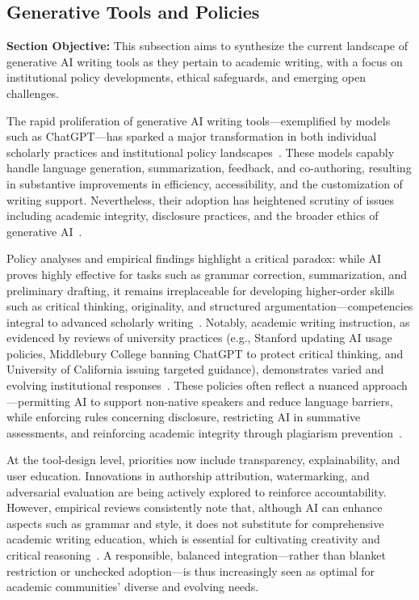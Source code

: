\documentclass[sigconf]{acmart}
\begin{document}
\subsection{Generative Tools and Policies}

\textbf{Section Objective:} This subsection aims to synthesize the current landscape of generative AI writing tools as they pertain to academic writing, with a focus on institutional policy developments, ethical safeguards, and emerging open challenges.

The rapid proliferation of generative AI writing tools—exemplified by models such as ChatGPT—has sparked a major transformation in both individual scholarly practices and institutional policy landscapes~\cite{ref104,ref109,ref110}. These models capably handle language generation, summarization, feedback, and co-authoring, resulting in substantive improvements in efficiency, accessibility, and the customization of writing support. Nevertheless, their adoption has heightened scrutiny of issues including academic integrity, disclosure practices, and the broader ethics of generative AI~\cite{ref104,ref109}.

Policy analyses and empirical findings highlight a critical paradox: while AI proves highly effective for tasks such as grammar correction, summarization, and preliminary drafting, it remains irreplaceable for developing higher-order skills such as critical thinking, originality, and structured argumentation—competencies integral to advanced scholarly writing~\cite{ref104,ref109,ref110}. Notably, academic writing instruction, as evidenced by reviews of university practices (e.g., Stanford updating AI usage policies, Middlebury College banning ChatGPT to protect critical thinking, and University of California issuing targeted guidance), demonstrates varied and evolving institutional responses~\cite{ref109}. These policies often reflect a nuanced approach—permitting AI to support non-native speakers and reduce language barriers, while enforcing rules concerning disclosure, restricting AI in summative assessments, and reinforcing academic integrity through plagiarism prevention~\cite{ref104,ref110}.

At the tool-design level, priorities now include transparency, explainability, and user education. Innovations in authorship attribution, watermarking, and adversarial evaluation are being actively explored to reinforce accountability. However, empirical reviews consistently note that, although AI can enhance aspects such as grammar and style, it does not substitute for comprehensive academic writing education, which is essential for cultivating creativity and critical reasoning~\cite{ref109,ref110}. A responsible, balanced integration—rather than blanket restriction or unchecked adoption—is thus increasingly seen as optimal for academic communities' diverse and evolving needs.
\end{document}

